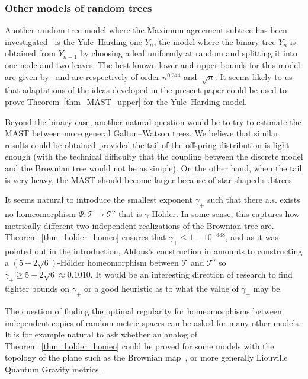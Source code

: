 \documentclass[JEP,XML,SOM,Unicode,NoFloatCountersInSection,published]{cedram}
\newcommand{\Tt}{\mathcal{T}}
\theoremstyle{plain}
\theoremstyle{definition}
\begin{document}
\subsubsection*{Other models of random trees}
Another random tree model where the Maximum agreement subtree has been investigated~\cite{bryant_size_2003, bernstein_bounds_2015} is the Yule--Harding one $Y_n$, \ie the model where the binary tree $Y_n$ is obtained from $Y_{n-1}$ by choosing a leaf uniformly at random and splitting it into one node and two leaves. The best known lower and upper bounds for this model are given by~\cite{bernstein_bounds_2015} and are respectively of order $n^{0.344}$ and~$\sqrt{n}$.
It seems likely to us that adaptations of the ideas developed in the present paper could be used to prove Theorem~\ref{thm_MAST_upper} for the Yule--Harding model.

Beyond the binary case, another natural question would be to try to estimate the MAST between more general Galton--Watson trees.
We believe that similar results could be obtained provided the tail of the offspring distribution is light enough (with the technical difficulty that the coupling between the discrete model and the Brownian tree would not be as simple).
On the other hand, when the tail is very heavy, the MAST should become larger because of star-shaped subtrees.

It seems natural to introduce the smallest exponent $\gamma_+$ such that there a.s. exists no homeomorphism $\Psi : \Tt\rightarrow \Tt'$ that is $\gamma$-Hölder. In some sense, this captures how metrically different two independent realizations of the Brownian tree are.
Theorem~\ref{thm_holder_homeo} ensures that $\gamma_{+} \leq 1-10^{-338}$, and as it was pointed out in the introduction, Aldous's construction in \cite{aldous_largest_2022} amounts to constructing a $(5-2\sqrt{6})$-Hölder homeomorphism between $\Tt$ and $\Tt'$ so $\gamma_{+}\geq 5-2\sqrt{6} \approx 0.1010$.
It would be an interesting direction of research to find tighter bounds on $\gamma_{+}$ or a good heuristic as to what the value of $\gamma_{+}$ may be.

The question of finding the optimal regularity for homeomorphisms between independent copies of random metric spaces can be asked for many other models.
It is for example natural to ask whether an analog of Theorem~\ref{thm_holder_homeo} could be proved for some models with the topology of the plane such as the Brownian map~\cite{LG11, Mie11}, or more generally Liouville Quantum Gravity metrics~\cite{GM21}.
\end{document}
